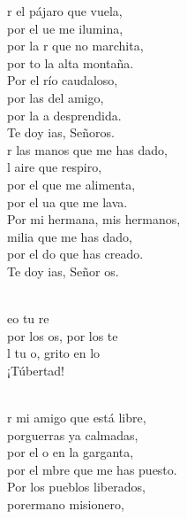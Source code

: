 \documentclass[12pt]{article}
\begin{document}
\begin{multicols*}{2}
\begin{cancion}%
	r el pájaro que vuela, \\
	por el ue me ilumina,\\
	por la r que no marchita, \\
	por to la alta montaña.\\
Por el río caudaloso, \\
	por las  del amigo,\\
	por la a desprendida.\\
	Te doy ias, Señoros.\\
	r las manos que me has dado,\\
	l aire que respiro,\\
	por el  que me alimenta, \\
	por el ua que me lava.\\
Por mi hermana, mis hermanos, \\
	milia que me has dado, \\
	por el do que has creado. \\
	Te doy ias, Señor os.\\\jump\\
	\begin{chorus}%
	eo tu re\\
	por los os, por los te  \\
	l tu o, grito en lo \\
	¡Túbertad! \\
	\end{chorus}%
	\jump\\
	r mi amigo que está libre, \\
	porguerras ya calmadas, \\
	por el o en la garganta, \\
	por el mbre que me has puesto. \\
Por los pueblos liberados, \\
	porermano misionero, \\

\end{cancion}
\end{multicols*}
\end{document}
